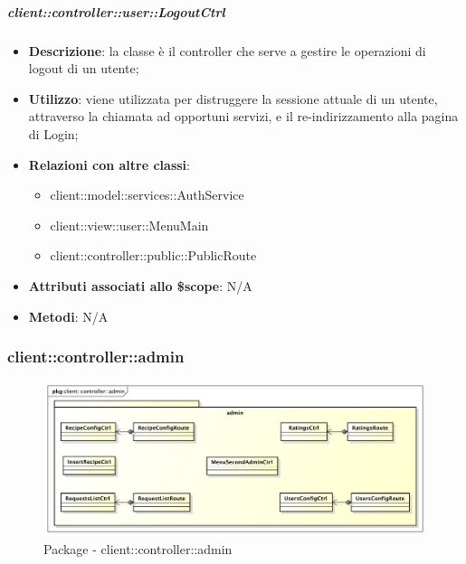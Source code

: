 		\subparagraph{client::controller::user::LogoutCtrl} %
		\label{subp:bdsm_app_client_controller_user_logoutctrl}

			\begin{itemize}
				\item \textbf{Descrizione}: la classe è il controller che serve a gestire le operazioni di logout di un utente;
				\item \textbf{Utilizzo}: viene utilizzata per distruggere la sessione attuale di un utente, attraverso la chiamata ad opportuni servizi, e il re-indirizzamento alla pagina di Login;
				\item \textbf{Relazioni con altre classi}:
					\begin{itemize}
						\item client::model::services::AuthService
						\item client::view::user::MenuMain
						\item client::controller::public::PublicRoute
					\end{itemize}
				\item \textbf{Attributi associati allo \$scope}: N/A
				\item \textbf{Metodi}: N/A
			\end{itemize}



\subsubsection{client::controller::admin} %
\label{ssub:bdsm_app_client_controller_admin}
\begin{figure}[htbp]
	\centering
	\centerline{\includegraphics[scale=0.45]{./images/client/client_controller_admin.pdf}}
	\caption{Package - client::controller::admin}
\end{figure}

